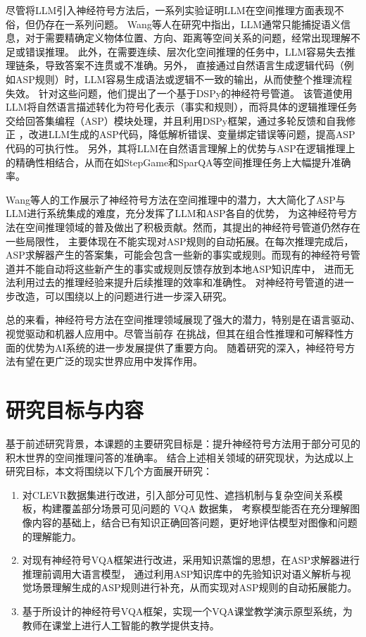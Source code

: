 尽管将LLM引入神经符号方法后，一系列实验证明LLM在空间推理方面表现不俗，但仍存在一系列问题。
Wang等人\cite{wang2024dspy}在研究中指出，LLM通常只能捕捉语义信息，对于需要精确定义物体位置、方向、距离等空间关系的问题，经常出现理解不足或错误推理。
此外，在需要连续、层次化空间推理的任务中，LLM容易失去推理链条，导致答案不连贯或不准确。另外，
直接通过自然语言生成逻辑代码（例如ASP规则）时，LLM容易生成语法或逻辑不一致的输出，从而使整个推理流程失效。
针对这些问题，他们提出了一个基于DSPy的神经符号管道。
该管道使用LLM将自然语言描述转化为符号化表示（事实和规则），而将具体的逻辑推理任务交给回答集编程（ASP）模块处理，并且利用DSPy框架，通过多轮反馈和自我修正
，改进LLM生成的ASP代码，降低解析错误、变量绑定错误等问题，提高ASP代码的可执行性。
另外，其将LLM在自然语言理解上的优势与ASP在逻辑推理上的精确性相结合，从而在如StepGame和SparQA等空间推理任务上大幅提升准确率。

Wang等人\cite{wang2024dspy}的工作展示了神经符号方法在空间推理中的潜力，大大简化了ASP与LLM进行系统集成的难度，充分发挥了LLM和ASP各自的优势，
为这神经符号方法在空间推理领域的普及做出了积极贡献。然而，其提出的神经符号管道仍然存在一些局限性，
主要体现在不能实现对ASP规则的自动拓展。在每次推理完成后，ASP求解器产生的答案集，可能会包含一些新的事实或规则。而现有的神经符号管道并不能自动将这些新产生的事实或规则反馈存放到本地ASP知识库中，
进而无法利用过去的推理经验来提升后续推理的效率和准确性。
对神经符号管道的进一步改造，可以围绕以上的问题进行进一步深入研究。

总的来看，神经符号方法在空间推理领域展现了强大的潜力，特别是在语言驱动、视觉驱动和机器人应用中。尽管当前存
在挑战，但其在组合性推理和可解释性方面的优势为AI系统的进一步发展提供了重要方向。
随着研究的深入，神经符号方法有望在更广泛的现实世界应用中发挥作用。
\section{研究目标与内容}
基于前述研究背景，本课题的主要研究目标是：提升神经符号方法用于部分可见的积木世界的空间推理问答的准确率。
结合上述相关领域的研究现状，为达成以上研究目标，本文将围绕以下几个方面展开研究：
\begin{enumerate}[label=(\arabic*),itemsep=0pt,parsep=0pt]
    \item 对CLEVR数据集进行改进，引入部分可见性、遮挡机制与复杂空间关系模板，构建覆盖部分场景可见问题的 VQA 数据集，
考察模型能否在充分理解图像内容的基础上，结合已有知识正确回答问题，更好地评估模型对图像和问题的理解能力。
    \item 对现有神经符号VQA框架进行改进，采用知识蒸馏的思想，在ASP求解器进行推理前调用大语言模型，
通过利用ASP知识库中的先验知识对语义解析与视觉场景理解生成的ASP规则进行补充，从而实现对ASP规则的自动拓展能力。
    \item 基于所设计的神经符号VQA框架，实现一个VQA课堂教学演示原型系统，为教师在课堂上进行人工智能的教学提供支持。
\end{enumerate}

